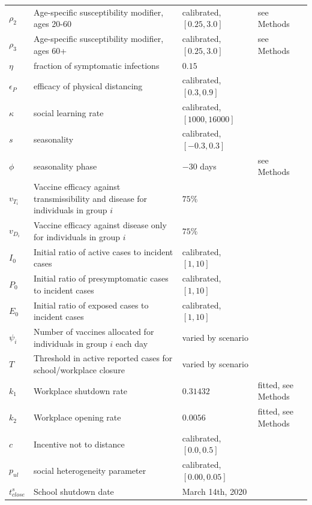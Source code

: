 \begin{table}[H]
\begin{tabular}{llll}
  $\rho_2$ & Age-specific susceptibility modifier, ages 20-60 & calibrated, $[0.25,3.0]$  & see Methods\\
  $\rho_3$ & Age-specific susceptibility modifier, ages 60+ & calibrated, $[0.25,3.0]$  & see Methods\\
  $\eta$ & fraction of symptomatic infections & $0.15$ & \cite{mizumoto2020estimating} \\
  $\epsilon_P$ & efficacy of physical distancing  & calibrated, $[0.3,0.9]$ & \cite{googlemobility, ontariocoviddata}  \\
  $\kappa$    & social learning rate   & calibrated, $[1000,16000]$ & \cite{googlemobility, ontariocoviddata} \\
  $ s $ & seasonality & calibrated, $[-0.3,0.3]$ & \cite{googlemobility, ontariocoviddata} \\
  $\phi$  & seasonality phase & $-30$ days & see Methods \\
  $ v_{T_i} $ & Vaccine efficacy against transmissibility and disease for individuals in group $i$  &  $75 \%$  & \cite{WHO_TPP} \\
  $ v_{D_i} $ & Vaccine efficacy against disease only for individuals in group $i$  &  $75 \%$  & \cite{WHO_TPP} \\
  $ I_0 $ & Initial ratio of active cases to incident cases & calibrated, $[1,10]$ & \cite{googlemobility, ontariocoviddata} \\
  $ P_0 $ & Initial ratio of presymptomatic cases to incident cases & calibrated, $[1,10]$ & \\
  $ E_0 $ & Initial ratio of exposed cases to incident cases & calibrated, $[1,10]$ & \\
  $\psi_i$ & Number of vaccines allocated for individuals in group $i$ each day & varied by scenario &  \\
  $T$ & Threshold in active reported cases for school/workplace closure & varied by scenario  &  \\
  $ k_1 $ & Workplace shutdown rate & $ 0.31432$ & fitted, see Methods \\
  $ k_2 $ & Workplace opening rate & $ 0.0056$ & fitted, see Methods \\
  $ c $ & Incentive not to distance & calibrated,$[0.0,0.5]$ & \cite{googlemobility, ontariocoviddata} \\
  $ p_{ul} $ & social heterogeneity parameter & calibrated, $[0.00,0.05]$ & \cite{googlemobility, ontariocoviddata}  \\
  $ t^s_{close} $ &  School shutdown date & March 14th, 2020 & \cite{school_closure}\\

\end{tabular}
\end{table}

